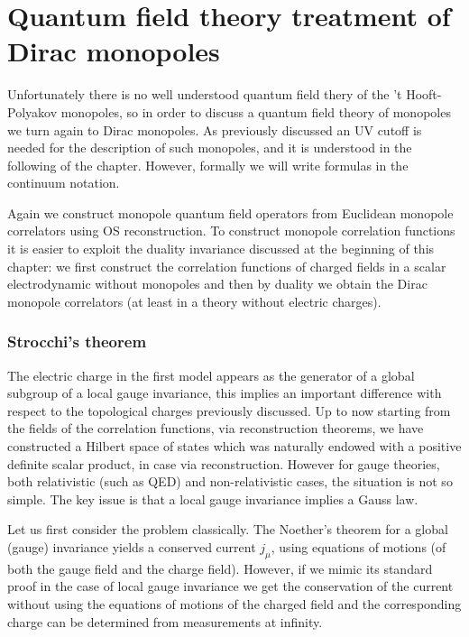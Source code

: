 \documentclass[../main/main.tex]{subfiles}
\begin{document}

\section{Quantum field theory treatment of Dirac monopoles}

Unfortunately there is no well understood quantum field thery of the 't Hooft-Polyakov monopoles, so in order to discuss a quantum field theory of monopoles we turn again to Dirac monopoles. As previously discussed an UV cutoff is needed for the description of such monopoles, and it is understood in the following of the chapter. However, formally we will write formulas in the continuum notation. 

Again we construct monopole quantum field operators from Euclidean monopole correlators using OS reconstruction. To construct monopole correlation functions it is easier to exploit the duality invariance discussed at the beginning of this chapter: we first construct the correlation functions of charged fields in a scalar electrodynamic without monopoles and then by duality we obtain the Dirac monopole correlators (at least in a theory without electric charges). 

\subsubsection{Strocchi's theorem}

The electric charge in the first model appears as the generator of a global subgroup of a local gauge invariance, this implies an important difference with respect to the topological charges previously discussed. 
Up to now starting from the fields of the correlation functions, via reconstruction theorems, we have constructed a Hilbert space of states which was naturally endowed with a positive definite scalar product, in case via reconstruction. 
However for gauge theories, both relativistic (such as QED) and non-relativistic cases, the situation is not so simple. The key issue is that a local gauge invariance implies a Gauss law. 

Let us first consider the problem classically. The Noether's theorem for a global (gauge) invariance yields a conserved current $j_\mu$, using equations of motions (of both the gauge field and the charge field). However, if we mimic its standard proof in the case of local gauge invariance we get the conservation of the current without using the equations of motions of the charged field and the corresponding charge can be determined from measurements at infinity. 
\end{document}
